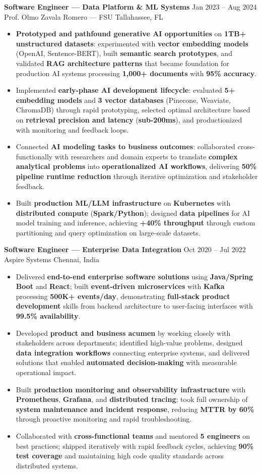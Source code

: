 \documentclass[letterpaper,10pt]{article}
\newcommand{\resumeItem}[1]{\item\small #1}
\newcommand{\resumeSubheading}[4]{
  \vspace{6pt}
  \noindent
  \textbf{#1} \hfill {\footnotesize #2} \\
  [-1pt]
  \noindent
  \small #3 \hfill {\small #4}
  \vspace{3pt}
}
\newcommand{\resumeItemsStart}{\vspace{-2pt}\begin{itemize}}
\newcommand{\resumeItemsEnd}{\end{itemize}\vspace{6pt}}
\begin{document}
\resumeSubheading
{Software Engineer — Data Platform \& ML Systems}{Jan 2023 -- Aug 2024}
{Prof. Olmo Zavala Romero — FSU}{Tallahassee, FL}
\resumeItemsStart
\resumeItem{\textbf{Prototyped and pathfound generative AI opportunities} on \textbf{1TB+ unstructured datasets}: experimented with \textbf{vector embedding models} (OpenAI, Sentence-BERT), built \textbf{semantic search prototypes}, and validated \textbf{RAG architecture patterns} that became foundation for production AI systems processing \textbf{1,000+ documents} with \textbf{95\% accuracy}.}
\resumeItem{Implemented \textbf{early-phase AI development lifecycle}: evaluated \textbf{5+ embedding models} and \textbf{3 vector databases} (Pinecone, Weaviate, ChromaDB) through rapid prototyping, selected optimal architecture based on \textbf{retrieval precision and latency} (\textbf{sub-200ms}), and productionized with monitoring and feedback loops.}
\resumeItem{Connected \textbf{AI modeling tasks to business outcomes}: collaborated cross-functionally with researchers and domain experts to translate \textbf{complex analytical problems} into \textbf{operationalized AI workflows}, delivering \textbf{50\% pipeline runtime reduction} through iterative optimization and stakeholder feedback.}
\resumeItem{Built \textbf{production ML/LLM infrastructure} on \textbf{Kubernetes} with \textbf{distributed compute} (\textbf{Spark/Python}); designed \textbf{data pipelines} for AI model training and inference, achieving \textbf{+40\% throughput} through custom partitioning and query optimization on large-scale datasets.}
\resumeItemsEnd
\vspace{-12pt}

\resumeSubheading
{Software Engineer — Enterprise Data Integration}{Oct 2020 -- Jul 2022}
{Aspire Systems}{Chennai, India}
\resumeItemsStart
\resumeItem{Delivered \textbf{end-to-end enterprise software solutions} using \textbf{Java/Spring Boot} and \textbf{React}; built \textbf{event-driven microservices} with \textbf{Kafka} processing \textbf{500K+ events/day}, demonstrating \textbf{full-stack product development} skills from backend architecture to user-facing interfaces with \textbf{99.5\% availability}.}
\resumeItem{Developed \textbf{product and business acumen} by working closely with stakeholders across departments; identified high-value problems, designed \textbf{data integration workflows} connecting enterprise systems, and delivered solutions that enabled \textbf{automated decision-making} with measurable operational impact.}
\resumeItem{Built \textbf{production monitoring and observability infrastructure} with \textbf{Prometheus}, \textbf{Grafana}, and \textbf{distributed tracing}; took full ownership of \textbf{system maintenance and incident response}, reducing \textbf{MTTR by 60\%} through proactive monitoring and rapid troubleshooting.}
\resumeItem{Collaborated with \textbf{cross-functional teams} and mentored \textbf{5 engineers} on best practices; shipped iteratively with rapid feedback cycles, achieving \textbf{90\% test coverage} and maintaining high code quality standards across distributed systems.}
\resumeItemsEnd
\vspace{-8pt}
\end{document}
